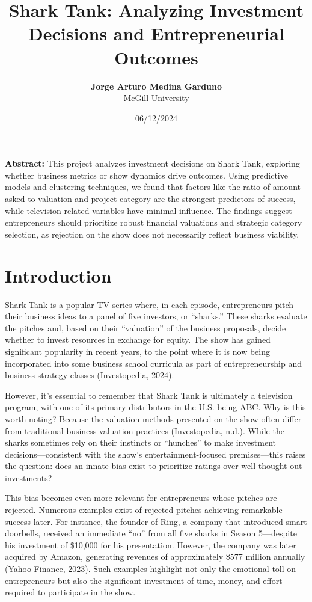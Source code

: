 \documentclass{article}
\begin{document}
\title{\textbf{\Large Shark Tank: Analyzing Investment Decisions and Entrepreneurial Outcomes}}
\author{\textbf{Jorge Arturo Medina Garduno} \\ McGill University}
\date{06/12/2024}

\maketitle

\noindent\textbf{Abstract:} This project analyzes investment decisions on Shark Tank, exploring whether business metrics or show dynamics drive outcomes. Using predictive models and clustering techniques, we found that factors like the ratio of amount asked to valuation and project category are the strongest predictors of success, while television-related variables have minimal influence. The findings suggest entrepreneurs should prioritize robust financial valuations and strategic category selection, as rejection on the show does not necessarily reflect business viability. \\
\smallskip

\section{Introduction}

Shark Tank is a popular TV series where, in each episode, entrepreneurs pitch their business ideas to a panel of five investors, or ``sharks.'' These sharks evaluate the pitches and, based on their ``valuation'' of the business proposals, decide whether to invest resources in exchange for equity. The show has gained significant popularity in recent years, to the point where it is now being incorporated into some business school curricula as part of entrepreneurship and business strategy classes (Investopedia, 2024).

However, it's essential to remember that Shark Tank is ultimately a television program, with one of its primary distributors in the U.S. being ABC. Why is this worth noting? Because the valuation methods presented on the show often differ from traditional business valuation practices (Investopedia, n.d.). While the sharks sometimes rely on their instincts or ``hunches'' to make investment decisions—consistent with the show’s entertainment-focused premises—this raises the question: does an innate bias exist to prioritize ratings over well-thought-out investments?

This bias becomes even more relevant for entrepreneurs whose pitches are rejected. Numerous examples exist of rejected pitches achieving remarkable success later. For instance, the founder of Ring, a company that introduced smart doorbells, received an immediate ``no'' from all five sharks in Season 5—despite his investment of \$10,000 for his presentation. However, the company was later acquired by Amazon, generating revenues of approximately \$577 million annually (Yahoo Finance, 2023). Such examples highlight not only the emotional toll on entrepreneurs but also the significant investment of time, money, and effort required to participate in the show.
\end{document}
